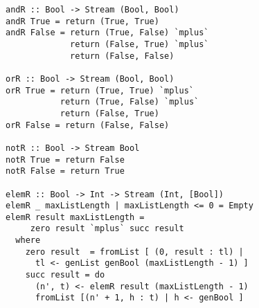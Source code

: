 \begin{figure}[!t]
  \centering
  \begin{minipage}{0.49\textwidth}
    \begin{lstlisting}[label={prop_helpers}, caption={Functions used in logic formulas generation}, captionpos=b, frame=tb]
andR :: Bool -> Stream (Bool, Bool)
andR True = return (True, True)
andR False = return (True, False) `mplus`
             return (False, True) `mplus`
             return (False, False)

orR :: Bool -> Stream (Bool, Bool)
orR True = return (True, True) `mplus`
           return (True, False) `mplus`
           return (False, True)
orR False = return (False, False)

notR :: Bool -> Stream Bool
notR True = return False
notR False = return True

elemR :: Bool -> Int -> Stream (Int, [Bool])
elemR _ maxListLength | maxListLength <= 0 = Empty
elemR result maxListLength =
     zero result `mplus` succ result
  where
    zero result  = fromList [ (0, result : tl) |
      tl <- genList genBool (maxListLength - 1) ]
    succ result = do
      (n', t) <- elemR result (maxListLength - 1)
      fromList [(n' + 1, h : t) | h <- genBool ]
    \end{lstlisting}
  \end{minipage}
\end{figure}


